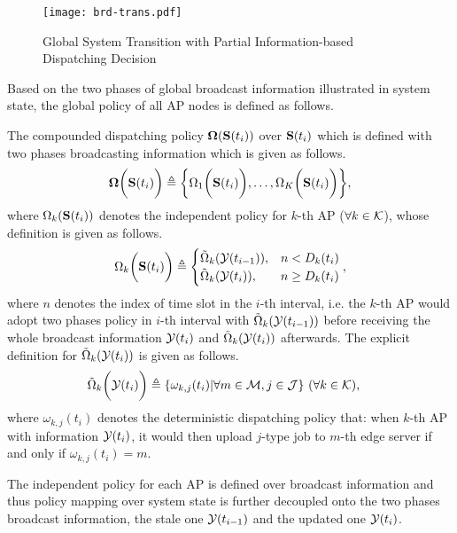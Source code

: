 \begin{figure}[ht]
    \centering
    \texttt{[image: brd-trans.pdf]}
    \caption{Global System Transition with Partial Information-based Dispatching Decision}
    \label{fig:brd-trans}
\end{figure}

Based on the two phases of global broadcast information illustrated in system state, the global policy of all AP nodes is defined as follows.
\begin{definition}
    The compounded dispatching policy $\boldsymbol{\Omega}(\mathbf{S}(t_{i}))$ over $\mathbf{S}(t_{i})$ which is defined with two phases broadcasting information which is given as follows.
    \begin{align}
        \boldsymbol{\Omega}\bigg(\mathbf{S}(t_{i})\bigg) \triangleq \bigg\{
            \Omega_{1}\bigg(\mathbf{S}(t_{i})\bigg), \dots, \Omega_{K}\bigg(\mathbf{S}(t_{i})\bigg)
        \bigg\},
    \end{align}
    where
    $\Omega_{k}(\mathbf{S}(t_{i}))$ denotes the independent policy for $k$-th AP ($\forall k\in\mathcal{K}$), whose definition is given as follows.
    \begin{align}
        \Omega_{k}\bigg(\mathbf{S}(t_{i})\bigg) \triangleq
        \begin{cases}
            \tilde{\Omega}_{k}( \mathcal{Y}(t_{i-1}) ), &n < D_{k}(t_{i})
            \\
            \tilde{\Omega}_{k}( \mathcal{Y}(t_{i}) ), &n \geq D_{k}(t_{i})
        \end{cases},
    \end{align}
    where $n$ denotes the index of time slot in the $i$-th interval, i.e. the $k$-th AP would adopt two phases policy in $i$-th interval with $\tilde{\Omega}_{k}(\mathcal{Y}(t_{i-1}))$ before receiving the whole broadcast information $\mathcal{Y}(t_{i})$ and $\tilde{\Omega}_{k}(\mathcal{Y}(t_{i}))$ afterwards.
    The explicit definition for $\tilde{\Omega}_{k}( \mathcal{Y}(t_{i}) )$ is given as follows.
    \begin{align}
        &\tilde{\Omega}_{k}\bigg(\mathcal{Y}(t_{i})\bigg) \triangleq \{\omega_{k,j}(t_{i})|\forall m\in\mathcal{M}, j\in\mathcal{J}\}
        ~(\forall k\in\mathcal{K}),
        \label{def_action}
    \end{align}
    where $\omega_{k,j}(t_{i})$ denotes the deterministic dispatching policy that: when $k$-th AP with information $\mathcal{Y}(t_{i})$, it would then upload $j$-type job to $m$-th edge server if and only if $\omega_{k,j}(t_{i})=m$.
    
\end{definition}
The independent policy for each AP is defined over broadcast information and thus policy mapping over system state is further decoupled onto the two phases broadcast information, the stale one $\mathcal{Y}(t_{i-1})$ and the updated one $\mathcal{Y}(t_{i})$.

